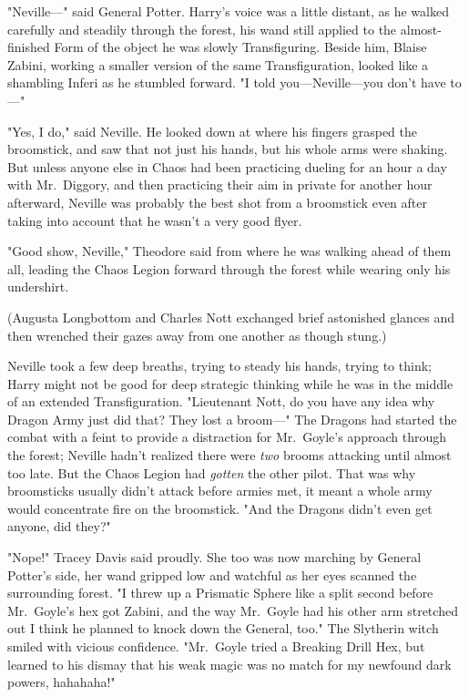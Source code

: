 "Neville—" said General Potter. Harry's voice was a little distant, as he
walked carefully and steadily through the forest, his wand still applied to the
almost-finished Form of the object he was slowly Transfiguring. Beside him,
Blaise Zabini, working a smaller version of the same Transfiguration, looked
like a shambling Inferi as he stumbled forward. "I told you—Neville—you
don't have to—"

"Yes, I do," said Neville. He looked down at where his fingers grasped the
broomstick, and saw that not just his hands, but his whole arms were shaking.
But unless anyone else in Chaos had been practicing dueling for an hour a day
with Mr.~Diggory, and then practicing their aim in private for another hour
afterward, Neville was probably the best shot from a broomstick even after
taking into account that he wasn't a very good flyer.

"Good show, Neville," Theodore said from where he was walking ahead of them
all, leading the Chaos Legion forward through the forest while wearing only his
undershirt.

(Augusta Longbottom and Charles Nott exchanged brief astonished glances and
then wrenched their gazes away from one another as though stung.)

Neville took a few deep breaths, trying to steady his hands, trying to think;
Harry might not be good for deep strategic thinking while he was in the middle
of an extended Transfiguration. "Lieutenant Nott, do you have any idea why
Dragon Army just did that? They lost a broom—" The Dragons had started the
combat with a feint to provide a distraction for Mr.~Goyle's approach through
the forest; Neville hadn't realized there were \emph{two} brooms attacking
until almost too late. But the Chaos Legion had \emph{gotten} the other pilot.
That was why broomsticks usually didn't attack before armies met, it meant a
whole army would concentrate fire on the broomstick. "And the Dragons didn't
even get anyone, did they?"

"Nope!" Tracey Davis said proudly. She too was now marching by General Potter's
side, her wand gripped low and watchful as her eyes scanned the surrounding
forest. "I threw up a Prismatic Sphere like a split second before Mr.~Goyle's
hex got Zabini, and the way Mr.~Goyle had his other arm stretched out I think
he planned to knock down the General, too." The Slytherin witch smiled with
vicious confidence. "Mr.~Goyle tried a Breaking Drill Hex, but learned to his
dismay that his weak magic was no match for my newfound dark powers, hahahaha!"

